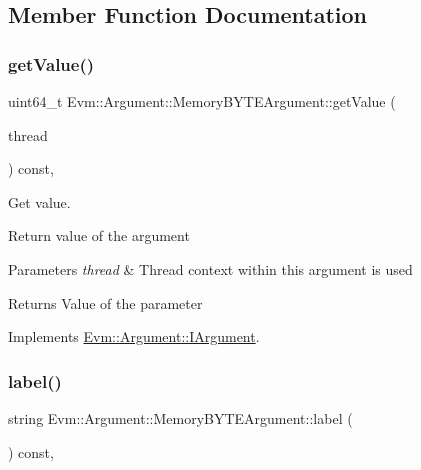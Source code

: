\subsection{Member Function Documentation}
\mbox{\label{struct_evm_1_1_argument_1_1_memory_b_y_t_e_argument_af038f3d7e425ef70f5688bda45eb8d31}} 
\subsubsection{\texorpdfstring{get\+Value()}{getValue()}}
{\footnotesize\ttfamily uint64\+\_\+t Evm\+::\+Argument\+::\+Memory\+B\+Y\+T\+E\+Argument\+::get\+Value (\begin{DoxyParamCaption}\item[{\mbox{\hyperlink{struct_evm_1_1_thread_context}{Thread\+Context}} \&}]{thread }\end{DoxyParamCaption}) const\hspace{0.3cm}{\ttfamily [override]}, {\ttfamily [virtual]}}



Get value. 

Return value of the argument 
\begin{DoxyParams}{Parameters}
{\em thread} & Thread context within this argument is used \\
\hline
\end{DoxyParams}
\begin{DoxyReturn}{Returns}
Value of the parameter 
\end{DoxyReturn}


Implements \mbox{\hyperlink{struct_evm_1_1_argument_1_1_i_argument_af01db10f34498344831877847c2fc038}{Evm\+::\+Argument\+::\+I\+Argument}}.

\mbox{\label{struct_evm_1_1_argument_1_1_memory_b_y_t_e_argument_afbe889873f7f6c825d9554e2029294b3}} 
\subsubsection{\texorpdfstring{label()}{label()}}
{\footnotesize\ttfamily string Evm\+::\+Argument\+::\+Memory\+B\+Y\+T\+E\+Argument\+::label (\begin{DoxyParamCaption}{ }\end{DoxyParamCaption}) const\hspace{0.3cm}{\ttfamily [override]}, {\ttfamily [virtual]}}



